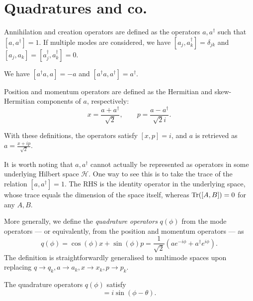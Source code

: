 \documentclass[12pt]{report}
\newcommand{\calH}{{\mathcal{H}}}
\begin{document}
\section{Quadratures and co.}

\begin{defn}
	Annihilation and creation operators are defined as the operators $a,a^\dagger$ such that $[a,a^\dagger]=1$.
	If multiple modes are considered, we have $[a_j,a_k^\dagger]=\delta_{jk}$ and $[a_j,a_k]=[a_j^\dagger,a_k^\dagger]=0$.
\end{defn}

\begin{prop}
	We have $[a^\dagger a, a] = -a$ and
	$[a^\dagger a, a^\dagger] = a^\dagger$.
\end{prop}

\begin{defn}
	Position and momentum operators are defined as the Hermitian and skew-Hermitian components of $a$, respectively:
	\begin{equation}
		x = \frac{a + a^\dagger}{\sqrt2},
		\qquad
		p = \frac{a - a^\dagger}{\sqrt2 i}.
	\end{equation}
\end{defn}
With these definitions, the operators satisfy $[x,p]=i$, and $a$ is retrieved as
$a = \frac{x + ip}{\sqrt2}$.

It is worth noting that $a,a^\dagger$ cannot actually be represented as operators in some underlying Hilbert space $\calH$. One way to see this is to take the trace of the relation $[a,a^\dagger]=1$.
The RHS is the identity operator in the underlying space, whose trace equals the dimension of the space itself, whereas $\Tr([A,B])=0$ for any $A,B$.

\begin{defn}
	More generally, we define the \emph{quadrature operators} $q(\phi)$ from the mode operators --- or equivalently, from the position and momentum operators --- as
	\begin{equation}
		q(\phi) = \cos(\phi) x + \sin(\phi) p
		= \frac{1}{\sqrt2}(a e^{-i\phi} + a^\dagger e^{i\phi}).
	\end{equation}
	The definition is straightforwardly generalised to multimode spaces upon replacing $q\to q_k, a\to a_k, x\to x_k,p\to p_k$.
\end{defn}

\begin{prop}
	The quadrature operators $q(\phi)$ satisfy
	\begin{equation}
		[q(\theta), q(\phi)] = i \sin(\phi-\theta).
	\end{equation}
\end{prop}
\end{document}
